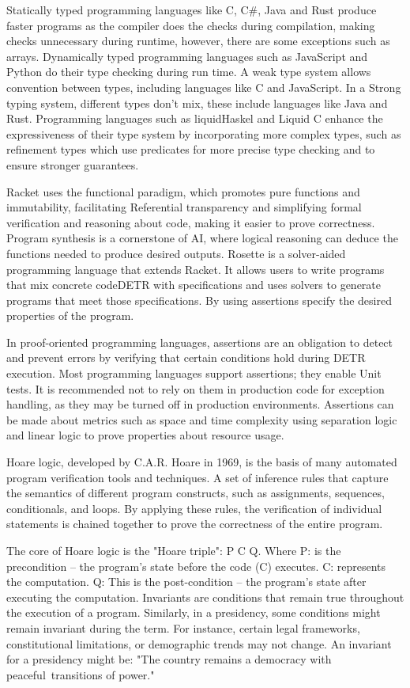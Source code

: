 \documentclass{article}
\begin{document}
Statically typed programming languages like C,  C\#, Java and Rust produce faster programs as the compiler does the checks during compilation, making checks unnecessary during runtime, however, there are some exceptions such as arrays. Dynamically typed programming languages such as JavaScript and Python do their type checking during run time. A weak type system allows convention between types, including languages like C and JavaScript. In a Strong typing system, different types don't mix, these include languages like Java and Rust. Programming languages such as liquidHaskel and Liquid C enhance the expressiveness of their type system by incorporating more complex types, such as refinement types which use predicates for more precise type checking and to ensure stronger guarantees.
 
Racket uses the functional paradigm, which promotes pure functions and immutability, facilitating Referential transparency and simplifying formal verification and reasoning about code, making it easier to prove correctness. Program synthesis is a cornerstone of AI, where logical reasoning can deduce the functions needed to produce desired outputs.  Rosette is a solver-aided programming language that extends Racket. It allows users to write programs that mix concrete codeDETR with specifications and uses solvers to generate programs that meet those specifications. By using assertions specify the desired properties of the program.

In proof-oriented programming languages, assertions are an obligation to detect and prevent errors by verifying that certain conditions hold during DETR execution. Most programming languages support assertions; they enable Unit tests. It is recommended not to rely on them in production code for exception handling, as they may be turned off in production environments. Assertions can be made about metrics such as space and time complexity using separation logic and linear logic to prove properties about resource usage. 

Hoare logic, developed by C.A.R. Hoare in 1969, is the basis of many automated program verification tools and techniques. A set of inference rules that capture the semantics of different program constructs, such as assignments, sequences, conditionals, and loops. By applying these rules, the verification of individual statements is chained together to prove the correctness of the entire program. 

The core of Hoare logic is the "Hoare triple": {P} C {Q}. Where P:  is the precondition –  the program's state before the code (C) executes.  C: represents the computation.  Q: This is the post-condition – the program's state after executing the computation.  Invariants are conditions that remain true throughout the execution of a program. Similarly, in a presidency, some conditions might remain invariant during the term. For instance, certain legal frameworks, constitutional limitations, or demographic trends may not change. An invariant for a presidency might be: "The country remains a democracy with peaceful transitions of power." 
\end{document}
